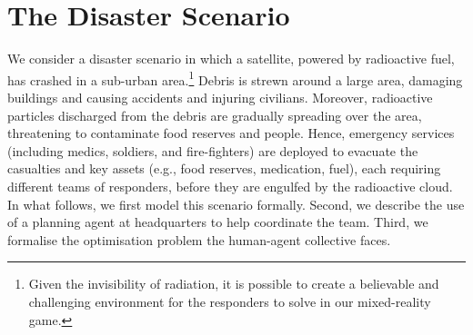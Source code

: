 \section{The Disaster Scenario}\label{sec:scenario}
\noindent We consider a disaster scenario in which a satellite, powered by radioactive fuel,  has crashed in a sub-urban area.\footnote{Given the invisibility of radiation, it is possible to create a believable and challenging environment for the responders to solve in our mixed-reality game.} Debris is strewn around a large area, damaging buildings and causing accidents and injuring civilians. Moreover, radioactive particles discharged from the debris are gradually spreading over the area, threatening to contaminate food reserves and people. Hence, emergency services (including medics, soldiers, and fire-fighters) are deployed to  evacuate the casualties and key assets (e.g., food reserves, medication, fuel), each requiring different teams of responders, before they are engulfed by the radioactive cloud.  In what follows, we first model this scenario formally. Second, we describe the use of a planning agent at headquarters to help coordinate the team. Third, we formalise  the optimisation problem the human-agent collective faces.


